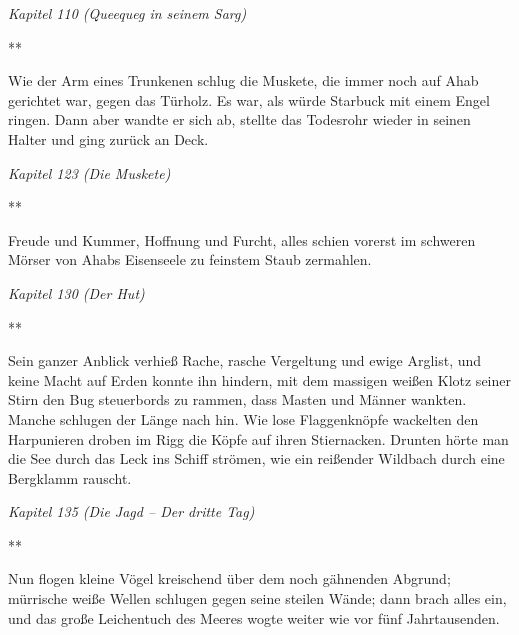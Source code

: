 \documentclass[a5paper,9pt,twoside=false]{extbook}
\begin{document}
\medskip
\noindent\footnotesize{\textit{Kapitel 110 (Queequeg in seinem Sarg)}}
\normalsize



\medskip
{\centering \small*** \\}
\bigskip

\noindent Wie der Arm eines Trunkenen schlug die Muskete, die immer noch auf Ahab gerichtet war, gegen das Türholz. Es war, als würde Starbuck mit einem Engel ringen. Dann aber wandte er sich ab, stellte das Todesrohr wieder in seinen Halter und ging zurück an Deck.

\medskip
\noindent\footnotesize{\textit{Kapitel 123 (Die Muskete)}}
\normalsize

\medskip
{\centering \small*** \\}
\bigskip

\noindent Freude und Kummer, Hoffnung und Furcht, alles schien vorerst im schweren Mörser von Ahabs Eisenseele zu feinstem Staub zermahlen.

\medskip
\noindent\footnotesize{\textit{Kapitel 130 (Der Hut)}}
\normalsize

\medskip
{\centering \small*** \\}
\bigskip

\noindent Sein ganzer Anblick verhieß Rache, rasche Vergeltung und ewige Arglist, und keine Macht auf Erden konnte ihn hindern, mit dem massigen weißen Klotz seiner Stirn den Bug steuerbords zu rammen, dass Masten und Männer wankten. Manche schlugen der Länge nach hin. Wie lose Flaggenknöpfe wackelten den Harpunieren droben im Rigg die Köpfe auf ihren Stiernacken. Drunten hörte man die See durch das Leck ins Schiff strömen, wie ein reißender Wildbach durch eine Bergklamm rauscht.

\medskip
\noindent\footnotesize{\textit{Kapitel 135 (Die Jagd -- Der dritte Tag)}}
\normalsize

\medskip
{\centering \small*** \\}
\bigskip

\noindent Nun flogen kleine Vögel kreischend über dem noch gähnenden Abgrund; mürrische weiße Wellen schlugen gegen seine steilen Wände; dann brach alles ein, und das große Leichentuch des Meeres wogte weiter wie vor fünf Jahrtausenden.
\end{document}
